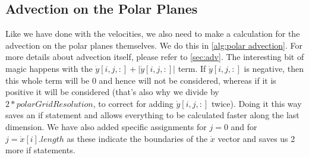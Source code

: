\subsection{Advection on the Polar Planes}
Like we have done with the velocities, we also need to make a calculation for the advection on the polar planes themselves. We do this in \autoref{alg:polar advection}. For more details about 
advection itself, please refer to \autoref{sec:adv}. The interesting bit of magic happens with the $\dot{y}[i, j, :] + |\dot{y}[i, j, :]|$ term. If $\dot{y}[i, j, :]$ is negative, then this 
whole term will be $0$ and hence will not be considered, whereas if it is positive it will be considered (that's also why we divide by $2 * polarGridResolution$, to correct for adding 
$\dot{y}[i, j, :]$ twice). Doing it this way saves an if statement and allows everything to be calculated faster along the last dimension. We have also added specific assignments for $j = 0$ and 
for $j = \dot{x}[i].length$ as these indicate the boundaries of the $\dot{x}$ vector and saves us 2 more if statements.

